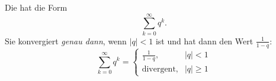 Die  hat die Form
$$\sum_{k=0}^\infty q^k.$$
Sie konvergiert \textit{genau dann}, wenn $|q| < 1$ ist und hat dann den Wert $\frac{1}{1-q}$:
$$\sum_{k=0}^\infty q^k = \begin{cases}
    \frac{1}{1-q}, & |q| < 1 \\
    \text{divergent}, & |q| \geq 1
\end{cases}$$